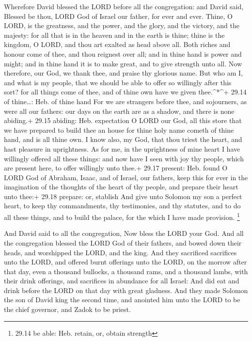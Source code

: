  Wherefore David blessed the LORD before all the
congregation: and David said, Blessed be thou, LORD God of Israel our
father, for ever and ever.  Thine, O LORD, is the
greatness, and the power, and the glory, and the victory, and the
majesty: for all that is in the heaven and in the earth is thine; thine
is the kingdom, O LORD, and thou art exalted as head above all.
 Both riches and honour come of thee, and thou reignest
over all; and in thine hand is power and might; and in thine hand it is
to make great, and to give strength unto all.  Now
therefore, our God, we thank thee, and praise thy glorious name.
 But who am I, and what is my people, that we should be
able to offer so willingly after this sort? for all things come of thee,
and of thine own have we given thee.\^{}*\^{}+ 29.14 of thine\ldots:
Heb. of thine hand  For we are strangers before thee, and
sojourners, as were all our fathers: our days on the earth are as a
shadow, and there is none abiding.+ 29.15 abiding: Heb. expectation
 O LORD our God, all this store that we have prepared to
build thee an house for thine holy name cometh of thine hand, and is all
thine own.  I know also, my God, that thou triest the
heart, and hast pleasure in uprightness. As for me, in the uprightness
of mine heart I have willingly offered all these things: and now have I
seen with joy thy people, which are present here, to offer willingly
unto thee.+ 29.17 present: Heb. found  O LORD God of
Abraham, Isaac, and of Israel, our fathers, keep this for ever in the
imagination of the thoughts of the heart of thy people, and prepare
their heart unto thee:+ 29.18 prepare: or, stablish  And
give unto Solomon my son a perfect heart, to keep thy commandments, thy
testimonies, and thy statutes, and to do all these things, and to build
the palace, for the which I have made provision. \footnote{29.14 be
  able: Heb. retain, or, obtain strength}

 And David said to all the congregation, Now bless the LORD
your God. And all the congregation blessed the LORD God of their
fathers, and bowed down their heads, and worshipped the LORD, and the
king.  And they sacrificed sacrifices unto the LORD, and
offered burnt offerings unto the LORD, on the morrow after that day,
even a thousand bullocks, a thousand rams, and a thousand lambs, with
their drink offerings, and sacrifices in abundance for all Israel:
 And did eat and drink before the LORD on that day with
great gladness. And they made Solomon the son of David king the second
time, and anointed him unto the LORD to be the chief governor, and Zadok
to be priest.

